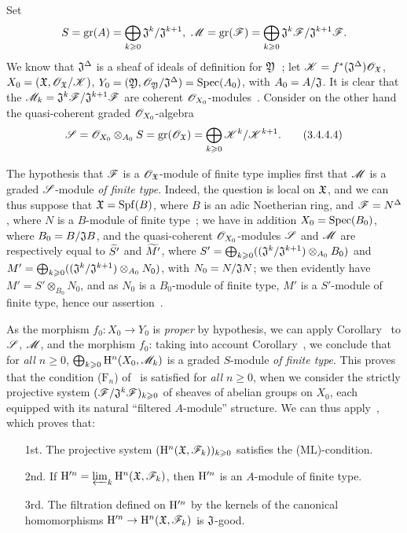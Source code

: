 Set
\[
\label{3.3.4.4.3}
  S=\gr(A)=\bigoplus_{k\geq 0}\fk{J}^k/\fk{J}^{k+1},\ \sh{M}=\gr(\sh{F})=\bigoplus_{k\geq 0}\fk{J}^k\sh{F}/\fk{J}^{k+1}\sh{F}.
\]
We know that $\mathfrak{J}^\Delta$ is a sheaf of ideals of definition for $\mathfrak{Y}$~; let $\mathscr{K}=f^*(\mathfrak{J}^\Delta)\mathscr{O}_\mathfrak{X}$, $X_0=(\mathfrak{X},\mathscr{O}_\mathfrak{X}/\mathscr{K})$, $Y_0=(\mathfrak{Y},\mathscr{O}_\mathfrak{Y}/\mathfrak{J}^\Delta)={\mathop{\mathrm{Spec}}\nolimits}(A_0)$, with $A_0=A/\mathfrak{J}$.
It is clear that the $\mathscr{M}_k=\mathfrak{J}^k\mathscr{F}/\mathfrak{J}^{k+1}\mathscr{F}$ are coherent $\mathscr{O}_{X_0}$-modules~.
Consider on the other hand the quasi-coherent graded $\mathscr{O}_{X_0}$-algebra
\[
\label{3.3.4.4.4}
  \mathscr{S}=\mathscr{O}_{X_0}\otimes_{A_0}S={\mathop{\mathrm{gr}}\nolimits}(\mathscr{O}_\mathfrak{X})=\bigoplus_{k\geqslant 0}\mathscr{K}^k/\mathscr{K}^{k+1}.
  \tag{3.4.4.4}
\]

The hypothesis that $\mathscr{F}$ is a $\mathscr{O}_\mathfrak{X}$-module of finite type implies first that $\mathscr{M}$ is
a graded $\mathscr{S}$-module \emph{of finite type}.
Indeed, the question is local on $\mathfrak{X}$, and we can thus suppose that $\mathfrak{X}={\mathop{\mathrm{Spf}}\nolimits}(B)$, where $B$ is an adic Noetherian ring, and $\mathscr{F}=N^\Delta$, where $N$ is a $B$-module of finite type~; we have in addition $X_0={\mathop{\mathrm{Spec}}\nolimits}(B_0)$, where $B_0=B/\mathfrak{J}B$, and the quasi-coherent $\mathscr{O}_{X_0}$-modules $\mathscr{S}$ and $\mathscr{M}$ are respectively equal to ${\widetilde{S'}}$ and ${\widetilde{M'}}$, where $S'=\bigoplus_{k\geqslant 0}((\mathfrak{J}^k/\mathfrak{J}^{k+1})\otimes_{A_0}B_0)$ and $M'=\bigoplus_{k\geqslant 0}((\mathfrak{J}^k/\mathfrak{J}^{k+1})\otimes_{A_0}N_0)$, with $N_0=N/\mathfrak{J}N$; we then evidently have $M'=S'\otimes_{B_0}N_0$, and as $N_0$ is a $B_0$-module of finite type, $M'$ is a $S'$-module of finite type, hence our assertion~.

As the morphism $f_0:X_0\to Y_0$ is \emph{proper} by hypothesis, we can apply Corollary~ to $\mathscr{S}$, $\mathscr{M}$, and the morphism $f_0$: taking into account Corollary~, we conclude that for \emph{all $n\geq 0$}, $\bigoplus_{k\geqslant 0}\mathrm{H}^n(X_0,\mathscr{M}_k)$ is a graded $S$-module \emph{of finite type}.
This proves that the condition ($\text{F}_n$) of~ is satisfied for \emph{all $n\geq 0$}, when we consider the strictly projective system $(\mathscr{F}/\mathfrak{J}^k\mathscr{F})_{k\geqslant 0}$ of sheaves of abelian groups on $X_0$, each equipped with its natural ``filtered $A$-module'' structure.
We can thus apply~, which proves that:
\begin{enumerate}
  \item[1st.] The projective system $(\mathrm{H}^n(\mathfrak{X},\mathscr{F}_k))_{k\geqslant 0}$ satisfies the (ML)-condition.
  \item[2nd.] If $\mathrm{H}^{\prime n}=\varprojlim_k\mathrm{H}^n(\mathfrak{X},\mathscr{F}_k)$, then $\mathrm{H}^{\prime n}$ is an $A$-module of finite type.
  \item[3rd.] The filtration defined on $\mathrm{H}^{\prime n}$ by the kernels of the canonical homomorphisms $\HH^{\prime n}\to\HH^n(\fk{X},\sh{F}_k)$ is $\mathfrak{J}$-good.
\end{enumerate}

